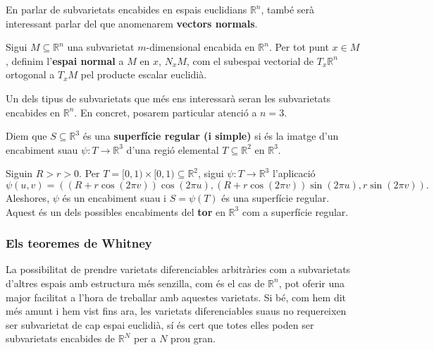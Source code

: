 En parlar de subvarietats encabides en espais euclidians $\mathbb R^n$, també serà interessant parlar del que anomenarem \textbf{vectors normals}.
\begin{defi}\label{def:espai_normal}
    Sigui $M\subseteq\mathbb R^n$ una subvarietat $m$-dimensional encabida en $\mathbb R^n$. Per tot punt $x\in M$, definim l'\textbf{espai normal} a $M$ en $x$, $N_xM$, com el subespai vectorial de $T_x\mathbb R^n$ ortogonal a $T_xM$ pel producte escalar euclidià.
\end{defi}

Un dels tipus de subvarietats que més ens interessarà seran les subvarietats encabides en $\mathbb R^n$. En concret, posarem particular atenció a $n=3$.

\begin{defi}
    Diem que $S\subseteq\mathbb R^3$ és una \textbf{superfície regular (i simple)} si és la imatge d'un encabiment suau $\psi:T\to\mathbb R^3$ d'una regió elemental $T\subseteq\mathbb R^2$ en $\mathbb R^3$.
\end{defi}

\begin{ex}\label{ex:tor}
    Siguin $R>r>0$. Per $T = [0,1)\times[0,1)\subseteq\mathbb R^2$, sigui $\psi:T\to\mathbb R^3$ l'aplicació
    \begin{equation*}
        \psi(u,v) = \left( (R+r\cos(2\pi v))\cos(2\pi u), (R+r\cos(2\pi v))\sin(2\pi u), r\sin(2\pi v) \right).
    \end{equation*}
    Aleshores, $\psi$ és un encabiment suau i $S = \psi(T)$ és una superfície regular. Aquest és un dels possibles encabiments del \textbf{tor} en $\mathbb R^3$ com a superfície regular.
\end{ex}

\subsubsection{Els teoremes de Whitney}
La possibilitat de prendre varietats diferenciables arbitràries com a subvarietats d'altres espais amb estructura més senzilla, com és el cas de $\mathbb R^n$, pot oferir una major facilitat a l'hora de treballar amb aquestes varietats. Si bé, com hem dit més amunt i hem vist fins ara, les varietats diferenciables suaus no requereixen ser subvarietat de cap espai euclidià, sí és cert que totes elles poden ser subvarietats encabides de $\mathbb R^N$ per a $N$ prou gran.

